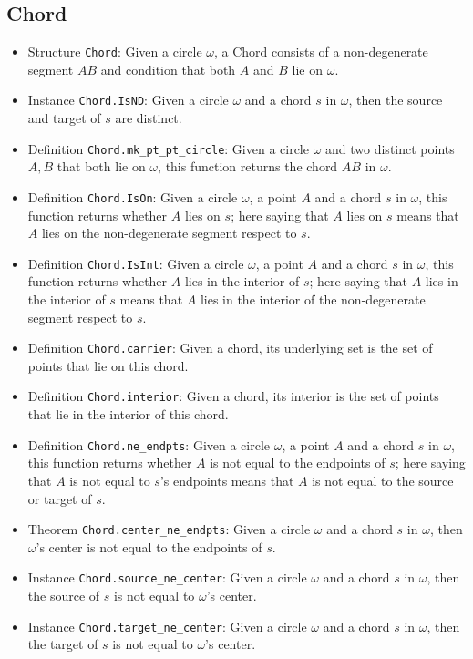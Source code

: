 \documentclass[12pt]{amsart}
\begin{document}
\subsection{Chord}
\begin{itemize}
    \item Structure \verb|Chord|: Given a circle $\omega$, a Chord consists of a non-degenerate segment $AB$ and condition that both $A$ and $B$ lie on $\omega$.
    \item Instance \verb|Chord.IsND|: Given a circle $\omega$ and a chord $s$ in $\omega$, then the source and target of $s$ are distinct.
    \item Definition \verb|Chord.mk_pt_pt_circle|: Given a circle $\omega$ and two distinct points $A,B$ that both lie on $\omega$, this function returns the chord $AB$ in $\omega$.
    \item Definition \verb|Chord.IsOn|: Given a circle $\omega$, a point $A$ and a chord $s$ in $\omega$, this function returns whether $A$ lies on $s$; here saying that $A$ lies on $s$ means that $A$ lies on the non-degenerate segment respect to $s$.
    \item Definition \verb|Chord.IsInt|: Given a circle $\omega$, a point $A$ and a chord $s$ in $\omega$, this function returns whether $A$ lies in the interior of $s$; here saying that $A$ lies in the interior of $s$ means that $A$ lies in the interior of the non-degenerate segment respect to $s$.
    \item Definition \verb|Chord.carrier|: Given a chord, its underlying set is the set of points that lie on this chord.
    \item Definition \verb|Chord.interior|: Given a chord, its interior is the set of points that lie in the interior of this chord.
    \item Definition \verb|Chord.ne_endpts|: Given a circle $\omega$, a point $A$ and a chord $s$ in $\omega$, this function returns whether $A$ is not equal to the endpoints of $s$; here saying that $A$ is not equal to $s$'s endpoints means that $A$ is not equal to the source or target of $s$.
    \item Theorem \verb|Chord.center_ne_endpts|: Given a circle $\omega$ and a chord $s$ in $\omega$, then $\omega$'s center is not equal to the endpoints of $s$.
    \item Instance \verb|Chord.source_ne_center|: Given a circle $\omega$ and a chord $s$ in $\omega$, then the source of $s$ is not equal to $\omega$'s center.
    \item Instance \verb|Chord.target_ne_center|: Given a circle $\omega$ and a chord $s$ in $\omega$, then the target of $s$ is not equal to $\omega$'s center.

\end{itemize}
\end{document}
